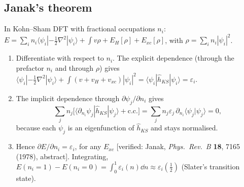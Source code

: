 \subsection{Janak's theorem}
In Kohn--Sham DFT with fractional occupations $n_i$:
$E=\sum_in_i\langle\psi_i|-\tfrac12\nabla^2|\psi_i\rangle+\int v\rho+E_H[\rho]+E_{xc}[\rho]$, with
$\rho=\sum_in_i|\psi_i|^2$.
\begin{enumerate}
  \item Differentiate with respect to $n_i$. The explicit dependence (through the prefactor $n_i$ and through
        $\rho$) gives $\langle\psi_i|-\tfrac12\nabla^2|\psi_i\rangle+\int(v+v_H+v_{xc})|\psi_i|^2=\langle\psi_i|\hat h_{KS}|\psi_i\rangle=\varepsilon_i$.
  \item The implicit dependence through $\partial\psi_j/\partial n_i$ gives
        \[\sum_jn_j\bigl[\langle\partial_{n_i}\psi_j|\hat h_{KS}|\psi_j\rangle+\text{c.c.}\bigr]=\sum_jn_j\varepsilon_j\,\partial_{n_i}\langle\psi_j|\psi_j\rangle=0,\]
        because each $\psi_j$ is an eigenfunction of $\hat h_{KS}$ and stays normalised.
  \item Hence $\partial E/\partial n_i=\varepsilon_i$, for any $E_{xc}$ [verified: Janak, \emph{Phys.\ Rev.\ B} \textbf{18}, 7165 (1978), abstract].
        Integrating, $E(n_i=1)-E(n_i=0)=\int_0^1\varepsilon_i(n)\dd n\approx\varepsilon_i(\tfrac12)$ (Slater's transition state).
\end{enumerate}

